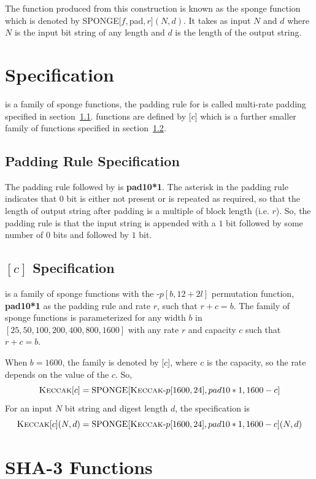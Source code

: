 The function produced from this construction is known as the sponge function which is denoted by SPONGE$[f, $pad$, r](N, d)$. It takes as input $N$ and $d$ where $N$ is the input bit string of any length and $d$ is the length of the output string.

\section{\KECCAK{} Specification}

\KECCAK{} is a family of sponge functions, the padding rule for \KECCAK{} is called multi-rate padding specified in section~\ref{padding}.  functions are defined by \KECCAK{}[$c$] which is a further smaller family of \KECCAK{} functions specified in section~\ref{keccakc}.

\subsection{Padding Rule Specification}
\label{padding}

The padding rule followed by \KECCAK{} is \textbf{pad10*1}. The asterisk in the padding rule indicates that $0$ bit is either not present or is repeated as required, so that the length of output string after padding is a multiple of block length (i.e. $r$). So, the padding rule is that the input string is appended with a $1$ bit followed by some number of $0$ bits and followed by $1$ bit.

\subsection{\KECCAK{}$[c]$ Specification}
\label{keccakc}

\KECCAK{} is a family of sponge functions with the \KECCAK{}-$p[b, 12 + 2l]$ permutation function, \textbf{pad10*1} as the padding rule and rate $r$, such that $r + c = b$. The family of sponge functions is parameterized for any width $b$ in $[25, 50,100,200,400,800,1600]$ with any rate $r$ and capacity $c$ such that $r + c = b$.

When $b = 1600$, the \KECCAK{} family is denoted by \KECCAK{}[$c$], where $c$ is the capacity, so the rate depends on the value of the $c$. So, 
\[\mbox{\textsc{Keccak}}{}[c] = \text{SPONGE}[\mbox{\textsc{Keccak}}{}\text{-}p[1600, 24], pad10*1, 1600-c]\]
For an input $N$ bit string and digest length $d$, the specification is 
\[\mbox{\textsc{Keccak}}{}[c](N, d) = \text{SPONGE}[\mbox{\textsc{Keccak}}{}\text{-}p[1600, 24], pad10*1, 1600-c](N, d)\]
\section{SHA-3 Functions}

